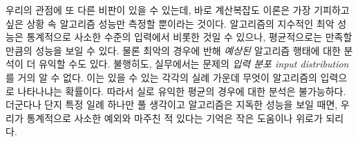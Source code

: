 \documentclass[a4paper,chapter,atbegshi,]{oblivoir}
\begin{document}
우리의 관점에 또 다른 비판이 있을 수 있는데, 바로 계산복잡도 이론은 
가장 기피하고 싶은 상황 속 알고리즘 성능만 측정할 뿐이라는 것이다.
알고리즘의 지수적인 최악 성능은 통계적으로 사소한 수준의 입력에서 
비롯한 것일 수 있으나, 평균적으로는 만족할 만큼의 성능을 보일 수 있다. 
물론 최악의 경우에 반해 \emph{예상된} 알고리즘 행태에 대한 분석이
더 유익할 수도 있다. 불행히도, 실무에서는 문제의 \emph{입력 분포\footnotesize
input distribution}를 거의 알 수 없다. 이는 있을 수 있는 각각의 실례
가운데 무엇이 알고리즘의 입력으로 나타나냐는 확률이다. 따라서
실로 유익한 평균의 경우에 대한 분석은 불가능하다. 더군다나 단지 특정 일례
하나만 풀 생각이고 알고리즘은 지독한 성능을 보일 때면, 우리가 통계적으로
사소한 예외와 마주친 적 있다는 기억은 작은 도움이나 위로가 되리다. 
\end{document}
